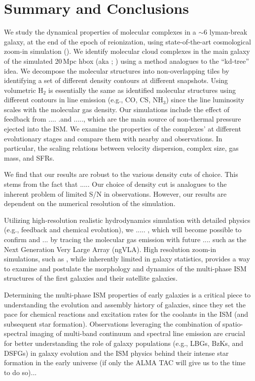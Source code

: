 \documentclass[apj]{emulateapj} %
\begin{document}
\section{Summary and Conclusions}      \label{sec:conclusion}

We study the dynamical properties of molecular complexes in a \z$\sim$6 lyman-break galaxy, 
at the end of the epoch of reionization, using state-of-the-art cosmological zoom-in simulation 
(). We identify molecular cloud complexes in the main galaxy of the 
simulated 20\,Mpc h\pmOne box (aka \flower; \citealt{Pallottini17a}) using a method analogues 
to the ``kd-tree'' idea. We decompose the molecular structures into non-overlapping tiles 
by identifying a set of different density contours at different snapshots. 
Using volumetric H$_2$ is essentially the same as identified molecular structures using
different contours in line emission (e.g., CO, CS, NH$_3$) since the line luminosity scales with the molecular gas density.
Our simulations include the effect of feedback from .... .and ....., which are the main source 
of non-thermal pressure ejected into the ISM.
We examine the properties of the complexes' at different evolutionary stages and compare 
them with nearby and \highz observations. In particular,
the scaling relations between velocity dispersion, complex size, gas mass, 
and SFRs.

We find that our results are robust to the various density cuts of choice. 
This stems from the 
fact that ..... Our choice of density cut is analogues to the inherent problem of limited S/N 
in observations.
However, our results are dependent on the numerical resolution of the simulation. 

Utilizing high-resolution realistic hydrodynamics simulation with 
detailed physics (e.g., feedback and chemical evolution), we 
..... , which will become possible to confirm and ... by tracing 
the molecular gas emission with future .... such as the Next Generation Very Large Array (ngVLA).
High resolution zoom-in simulations, such as , while inherently limited in galaxy 
statistics, provides a way to examine and postulate the morphology and dynamics of  
the multi-phase ISM structures of the first galaxies and their satellite galaxies.

Determining the multi-phase ISM properties of early galaxies 
is a critical piece to understanding the evolution and 
assembly history of galaxies, since they set the pace 
for chemical reactions and excitation rates for the coolants in the ISM (and subsequent star formation). 
Observations leveraging the combination of spatio-spectral imaging of 
multi-band continuum and spectral line emission are crucial for better understanding 
the role of \highz galaxy populations 
(e.g., LBGs, BzKs, and DSFGs) in 
galaxy evolution and the ISM physics behind their intense star formation in the early universe 
(if only the ALMA TAC will give us to the time to do so)...
\end{document}
